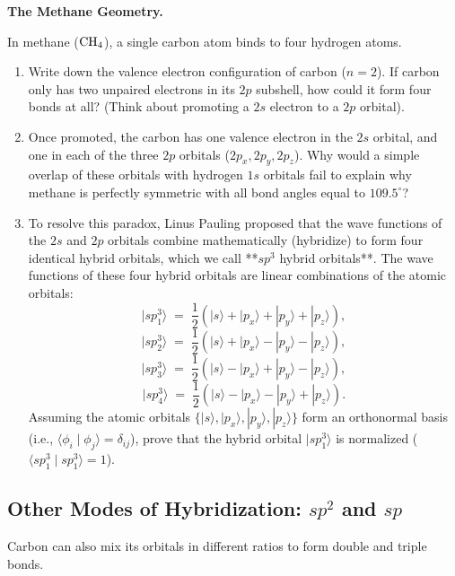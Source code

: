 \documentclass[12pt, a4paper]{book}
\begin{document}
\begin{puzzlebox}
\textbf{The Methane Geometry.}

In methane ($\ce{CH4}$), a single carbon atom binds to four hydrogen atoms.
\begin{enumerate}[label=(\alph*), leftmargin=*]
  \item Write down the valence electron configuration of carbon ($n = 2$). If carbon only has two unpaired electrons in its $2p$ subshell, how could it form four bonds at all? (Think about promoting a $2s$ electron to a $2p$ orbital).
  \item Once promoted, the carbon has one valence electron in the $2s$ orbital, and one in each of the three $2p$ orbitals ($2p_x, 2p_y, 2p_z$).
        Why would a simple overlap of these orbitals with hydrogen $1s$ orbitals fail to explain why methane is perfectly symmetric with all bond angles equal to $109.5^\circ$?
  \item To resolve this paradox, Linus Pauling proposed that the wave functions of the $2s$ and $2p$ orbitals combine mathematically (hybridize) to form four identical hybrid orbitals, which we call **$sp^3$ hybrid orbitals**.
        The wave functions of these four hybrid orbitals are linear combinations of the atomic orbitals:
        \[
          |sp^3_1\rangle \;=\; \frac{1}{2}\left( |s\rangle + |p_x\rangle + |p_y\rangle + |p_z\rangle \right),
        \]
        \[
          |sp^3_2\rangle \;=\; \frac{1}{2}\left( |s\rangle + |p_x\rangle - |p_y\rangle - |p_z\rangle \right),
        \]
        \[
          |sp^3_3\rangle \;=\; \frac{1}{2}\left( |s\rangle - |p_x\rangle + |p_y\rangle - |p_z\rangle \right),
        \]
        \[
          |sp^3_4\rangle \;=\; \frac{1}{2}\left( |s\rangle - |p_x\rangle - |p_y\rangle + |p_z\rangle \right).
        \]
        Assuming the atomic orbitals $\{|s\rangle, |p_x\rangle, |p_y\rangle, |p_z\rangle\}$ form an orthonormal basis (i.e., $\langle \phi_i \mid \phi_j \rangle = \delta_{ij}$), prove that the hybrid orbital $|sp^3_1\rangle$ is normalized ($\langle sp^3_1 \mid sp^3_1 \rangle = 1$).
\end{enumerate}
\end{puzzlebox}

\subsection{Other Modes of Hybridization: $sp^2$ and $sp$}

Carbon can also mix its orbitals in different ratios to form double and triple bonds.
\end{document}
